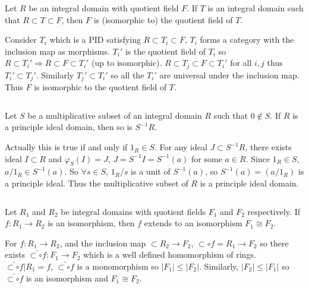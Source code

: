 $$ $$

\begin{ex}
    Let $R$ be an integral domain with quotient field $F$. If $T$ is an integral domain such that $R\subset T\subset F$, then $F$ is (isomorphic to) the quotient field of $T$.
\end{ex}

\begin{answer}
    Consider $T_{i}$ which is a PID satisfying $R\subset T_{i}\subset F$, $T_{i}$ forms a category with the inclusion map as morphisms. $T_{i}'$ is the quotient field of $T_{i}$ so $R\subset T_{i}'\Rightarrow R\subset F\subset T_{i}'$ (up to isomorphic). $R\subset T_{j}\subset F\subset T_{i}'$ for all $i,j$ thus $T_{i}'\subset T_{j}'$. Similarly $T_{j}'\subset T_{i}'$ so all the $T_{i}'$ are universal under the inclusion map. Thus $F$ is isomorphic to the quotient field of $T$.
\end{answer}

$$ $$

\begin{ex}
    Let $S$ be a multiplicative subset of an integral domain $R$ such that $0\notin S$. If $R$ is a principle ideal domain, then so is $S^{-1}R$.
\end{ex}

\begin{answer}
    Actually this is true if and only if $1_{R}\in S$. For any ideal $J\subset S^{-1}R$, there exists ideal $I\subset R$ and $\varphi_{S}(I)=J$, $J=S^{-1}I=S^{-1}(a)$ for some $a\in R$. Since $1_{R}\in S$, $a /1_{R}\in S^{-1}(a)$. So $\forall s\in S$, $1_{R} /s$ is a unit of $S^{-1}(a)$, so $S^{-1}(a)=(a /1_{R})$ is a principle ideal. Thus the multiplicative subset of $R$ is a principle ideal domain.
\end{answer}

$$ $$

\begin{ex}
    Let $R_{1}$ and $R_{2}$ be integral domains with quotient fields $F_{1}$ and $F_{2}$ respectively. If $f:R_{1}\to R_{2}$ is an isomorphism, then $f$ extends to an isomorphism $F_{1}\cong F_{2}$.
\end{ex}

\begin{answer}
    For $f:R_{1}\to R_{2}$, and the inclusion map $\subset R_{2}\to F_{2}$, $\subset\circ f=R_{1}\to F_{2}$ so there exists $\bar{\subset\circ f}:F_{1}\to F_{2}$ which is a well defined homomorphism of rings. $\bar{\subset\circ f}|R_{1}=f$, $\bar{\subset\circ f}$ is a monomorphism so $\left| F_{1} \right| \leq \left| F_{2} \right| $. Similarly, $\left| F_{2} \right| \leq \left| F_{1} \right| $ so $\bar{\subset\circ f}$ is an isomorphism and $F_{1}\cong F_{2}$.
\end{answer}

